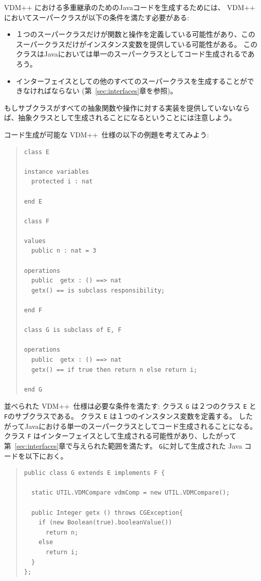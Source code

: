 \documentclass[\pformat,11pt]{jarticle}
\newcommand{\VDM}{VDM++}
\begin{document}
 \VDM{} における多重継承のためのJavaコードを生成するためには、 \VDM{} においてスーパークラスが以下の条件を満たす必要がある:

\begin{itemize}
\item １つのスーパークラスだけが関数と操作を定義している可能性があり、このスーパークラスだけがインスタンス変数を提供している可能性がある。
このクラスはJavaにおいては単一のスーパークラスとしてコード生成されるであろう。
\item インターフェイスとしての他のすべてのスーパークラスを生成することができなければならない (第~\ref{sec:interfaces}章を参照)。
\end{itemize}
もしサブクラスがすべての抽象関数や操作に対する実装を提供していないならば、抽象クラスとして生成されることになるということには注意しよう。

コード生成が可能な \VDM\ 仕様の以下の例題を考えてみよう:

\begin{quote}
\begin{small}
\begin{verbatim}
class E

instance variables
  protected i : nat

end E

class F

values
  public n : nat = 3

operations
  public  getx : () ==> nat
  getx() == is subclass responsibility;

end F

class G is subclass of E, F

operations
  public  getx : () ==> nat
  getx() == if true then return n else return i;

end G
\end{verbatim}
\end{small}
\end{quote}

並べられた \VDM\ 仕様は必要な条件を満たす:
クラス {\tt G} は２つのクラス {\tt E} と {\tt F}のサブクラスである。
クラス {\tt E} は１つのインスタンス変数を定義する。
したがってJavaにおける単一のスーパークラスとしてコード生成されることになる。
クラス {\tt F} はインターフェイスとして生成される可能性があり、したがって第~\ref{sec:interfaces}章で与えられた範囲を満たす。
 \texttt{G}に対して生成された Java コードを以下におく。

\begin{quote}
\begin{small}
\begin{verbatim}
public class G extends E implements F {

  static UTIL.VDMCompare vdmComp = new UTIL.VDMCompare();

  public Integer getx () throws CGException{
    if (new Boolean(true).booleanValue())
      return n;
    else
      return i;
  }
};
\end{verbatim}
\end{small}
\end{quote}
\end{document}
